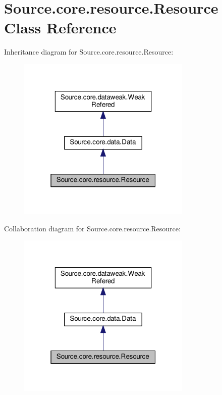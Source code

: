 \hypertarget{classSource_1_1core_1_1resource_1_1Resource}{}\section{Source.\+core.\+resource.\+Resource Class Reference}
\label{classSource_1_1core_1_1resource_1_1Resource}


Inheritance diagram for Source.\+core.\+resource.\+Resource\+:\nopagebreak
\begin{figure}[H]
\begin{center}
\leavevmode
\includegraphics[width=235pt]{classSource_1_1core_1_1resource_1_1Resource__inherit__graph}
\end{center}
\end{figure}


Collaboration diagram for Source.\+core.\+resource.\+Resource\+:\nopagebreak
\begin{figure}[H]
\begin{center}
\leavevmode
\includegraphics[width=235pt]{classSource_1_1core_1_1resource_1_1Resource__coll__graph}
\end{center}
\end{figure}
